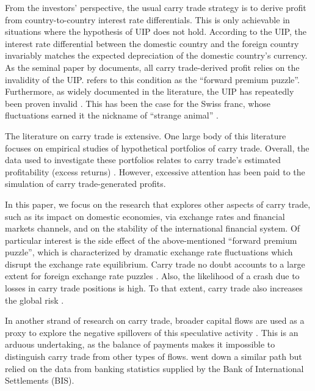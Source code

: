 \documentclass[a4paper, twoside]{templates/ociamthesis}
\begin{document}
From the investors' perspective, the usual carry trade strategy is to derive profit from country-to-country interest rate differentials. This is only achievable in situations where the hypothesis of UIP does not hold. According to the UIP, the interest rate differential between the domestic country and the foreign country invariably matches the expected depreciation of the domestic country's currency. As the seminal paper by \textcite{fama1984} documents, all carry trade-derived profit relies on the invalidity of the UIP. \textcite{brunnermeier2008} refers to this condition as the ``forward premium puzzle''. Furthermore, as widely documented in the literature, the UIP has repeatedly been proven invalid \autocites[e.g.][]{farhi2016,dupuy2021}. This has been the case for the Swiss franc, whose fluctuations earned it the nickname of ``strange animal'' \autocite{jochum2005}.

The literature on carry trade is extensive. One large body of this literature focuses on empirical studies of hypothetical portfolios of carry trade. Overall, the data used to investigate these portfolios relates to carry trade's estimated profitability (excess returns) \autocites[e.g.][]{burnside2007,clarida2009,darvas2009,menkhoff2012,cenedese2014,doskov2015,breedon2016}. However, excessive attention has been paid to the simulation of carry trade-generated profits.

In this paper, we focus on the research that explores other aspects of carry trade, such as its impact on domestic economies, via exchange rates and financial markets channels, and on the stability of the international financial system. Of particular interest is the side effect of the above-mentioned ``forward premium puzzle'', which is characterized by dramatic exchange rate fluctuations which disrupt the exchange rate equilibrium. Carry trade no doubt accounts to a large extent for foreign exchange rate puzzles \autocite{spronk2013}. Also, the likelihood of a crash due to losses in carry trade positions is high. To that extent, carry trade also increases the global risk \autocite{brunnermeier2008}.

In another strand of research on carry trade, broader capital flows are used as a proxy to explore the negative spillovers of this speculative activity \autocites[e.g.][]{dodd2007,spronk2013,fritz2014,prates2017,goda2019}. This is an arduous undertaking, as the balance of payments makes it impossible to distinguish carry trade from other types of flows. \textcite{miranda-agrippino2013} went down a similar path but relied on the data from banking statistics supplied by the Bank of International Settlements (BIS).
\end{document}
